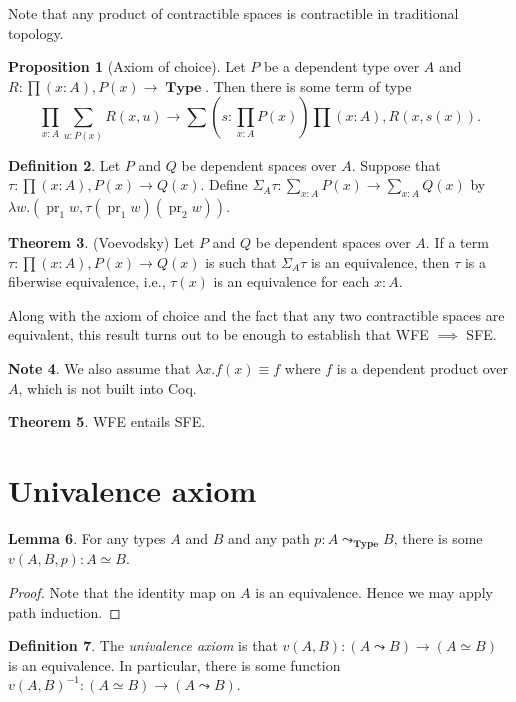 \documentclass[10pt,letterpaper,cm]{nupset}
\theoremstyle{definition}
\newtheorem{definition}{Definition}[subsection]
\newtheorem{note}[definition]{Note}
\theoremstyle{theorem}
\newtheorem{theorem}[definition]{Theorem}
\newtheorem{lemma}[definition]{Lemma}
\newtheorem{prop}[definition]{Proposition}
\theoremstyle{remark}
\newcommand{\1}{\mathbf{1}}
\newcommand{\0}{\vec 0}
\DeclareMathOperator{\pr}{pr}
\DeclareMathOperator{\type}{\mathbf{Type}}
\begin{document}
Note that any product of contractible spaces is contractible in traditional topology. 

\begin{prop}[Axiom of choice]
Let $P$ be a dependent type over $A$ and $R : \prod(x:A), P(x) \to \type$. Then there is some term of type $$\prod_{x:A}\sum_{u:P(x)} R(x, u) \to \sum(s:  \prod_{x:A} P(x)) \prod (x:A), R(x, s(x)) .$$
\end{prop}

\begin{definition}
Let $P$ and $Q$ be dependent spaces over $A$. Suppose that $\tau : \prod(x:A), P(x) \to Q(x)$. Define $\Sigma_A\tau : \sum_{x:A}P(x) \to \sum_{x:A} Q(x)$ by $\lambda w. (\pr_1 w, \tau(\pr_1w)(\pr_2w))$.
\end{definition}

\begin{theorem}{(Voevodsky)}
Let $P$ and $Q$ be dependent spaces over $A$. If a term $\tau : \prod(x:A), P(x) \to Q(x)$ is such that $\Sigma_A \tau$ is an equivalence, then $\tau$ is a fiberwise equivalence, i.e., $\tau(x)$ is an equivalence for each $x:A$. 
\end{theorem}

Along with the axiom of choice and the fact that any two contractible spaces are equivalent, this result turns out to be enough to establish that WFE $\implies$ SFE.

\begin{note}
We also assume that $\lambda x. f(x) \equiv f$ where $f$ is a dependent product over $A$, which is not built into Coq.
\end{note}

\begin{theorem}
WFE entails SFE.
\end{theorem}


\section{Univalence axiom}

\begin{lemma}
For any types $A$ and $B$ and any path $p: A \leadsto_{\type} B$, there is some $v(A, B, p) : A \simeq B$.  
\end{lemma}
\begin{proof}
Note that the identity map on $A$ is an equivalence. Hence we may apply path induction. 
\end{proof}

\begin{definition}
The \textit{univalence axiom} is that $v(A, B) : (A \leadsto B) \to (A \simeq B)$ is an equivalence. In particular, there is some function $v(A, B) ^{-1}: (A \simeq B) \to (A \leadsto B)$.
\end{definition}
\end{document}
